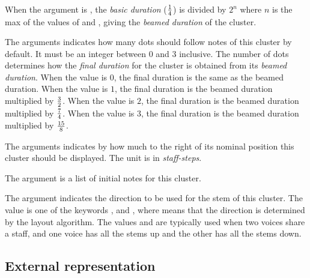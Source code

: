 When the  argument is , the
\emph{basic duration} ($1 \over 4$) is divided by $2^n$ where $n$ is the max
of the values of  and , giving the
\emph{beamed duration} of the cluster. 

The  arguments indicates how many dots should follow
notes of this cluster by default.  It must be an integer between $0$
and $3$ inclusive.  The number of dots determines how the \emph{final
duration} for the cluster is obtained from its \emph{beamed duration}.
When the value is $0$, the final duration is the same as the beamed
duration.  When the value is $1$, the final duration is the beamed
duration multiplied by $3 \over 2$.  When the value is $2$, the final
duration is the beamed duration multiplied by $7 \over 4$.  When the
value is $3$, the final duration is the beamed duration multiplied by
$15 \over 8$.

The  arguments indicates by how much to the right of
its nominal position this cluster should be displayed.  The unit is in
\emph{staff-steps}. 

The  argument is a list of initial notes for this
cluster.

The  argument indicates the direction to be
used for the stem of this cluster.  The value is one of the keywords
,  and , where
 means that the direction is determined by the layout
algorithm.  The values  and  are typically
used when two voices share a staff, and one voice has all the stems up
and the other has all the stems down. 

\subsection{External representation}



